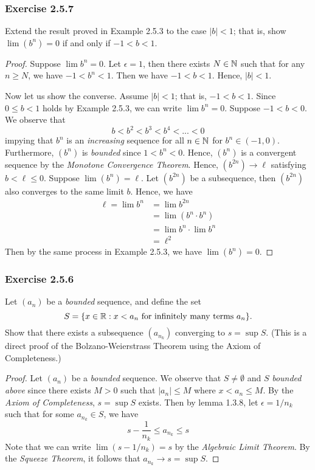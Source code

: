 \subsubsection{Exercise 2.5.7}
Extend the result proved in Example 2.5.3 to the case \(|b|<1\); that is, show \(\lim(b^n) = 0\) if and only if \(-1 < b < 1\). 
\begin{proof}
Suppose \(\lim b^n = 0 \). Let \( \epsilon = 1\), then there exists \( N \in \mathbb{N} \) such that for any \( n \geq N \), we have \( -1 < b^n < 1 \). Then we have \( -1 < b < 1 \). Hence, \( |b| < 1\). 

Now let us show the converse. Assume \( |b | < 1\); that is, \( -1 < b < 1 \). Since \( 0 \leq b < 1 \) holds by Example 2.5.3, we can write \( \lim b^n = 0  \). Suppose \( -1 < b < 0\). We observe that 
\[ b < b^2 < b^3 < b^4 < ... <  0\]
impying that \(b^n\) is an \textit{increasing} sequence for all \( n \in \mathbb{N} \) for \(b^n \in (-1, 0)\). Furthermore, \((b^n)\) is \textit{bounded} since \(1 < b^n < 0 \). Hence, \((b^n)\) is a convergent sequence by the \textit{Monotone Convergence Theorem}. Hence, \( (b^{2n}) \to \ell \) satisfying \( b < \ell \leq 0 \). Suppose \( \lim (b^n) = \ell\). Let \((b^{2n})\) be a subsequence, then \( (b^{2n})\) also converges to the same limit \(b \). Hence, we have 
\begin{align*}
    \ell = \lim b^n &= \lim b^{2n} \\
                 &= \lim (b^{n} \cdot b^{n}) \\
                 &= \lim b^n \cdot \lim b^n \\ 
                 &= \ell^2
\end{align*}
Then by the same process in Example 2.5.3, we have \( \lim (b^n) = 0 \).

\end{proof}

\subsubsection{Exercise 2.5.6}
Let \((a_n)\) be a \textit{bounded} sequence, and define the set 
\[ S = \{ x \in \mathbb{R} : x < a_n \text{ for infinitely many terms } a_n \}.\]
Show that there exists a subsequence \((a_{n_k})\) converging to \( s = \sup S\). (This is a direct proof of the Bolzano-Weierstrass Theorem using the Axiom of Completeness.) 

\begin{proof}
    Let \((a_n)\) be a \textit{bounded} sequence. We observe that \( S \neq \emptyset \) and \(S \) \textit{bounded above} since there exists \( M > 0\) such that \(|a_n| \leq M \) where \( x < a_n \leq M \). By the \textit{Axiom of Completeness}, \( s = \sup S \) exists. Then by lemma 1.3.8, let \( \epsilon = 1 / n_k \) such that for some \( a_{n_k} \in S \), we have 
    \[ s - \frac{1}{n_k} \leq a_{n_k} \leq s  \]
    Note that we can write \( \lim (s - 1 / n_k) = s \) by the \textit{Algebraic Limit Theorem}. By the \textit{Squeeze Theorem}, it follows that \( a_{n_k} \to s = \sup S\). 
\end{proof}

